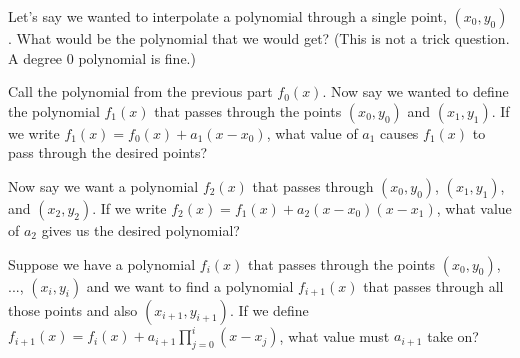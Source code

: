 \documentclass[11pt]{article}
\begin{document}
\begin{Parts}

	\Part Let's say we wanted to interpolate a polynomial through a single point, $(x_0, y_0)$.  What would be the polynomial that we would get?  (This is not a trick question. A degree 0 polynomial is fine.)
	
	\Part Call the polynomial from the previous part $f_0(x)$.  Now say we wanted to define the polynomial $f_1(x)$ that passes through the points $(x_0, y_0)$ and $(x_1, y_1)$.  If we write $f_1(x) = f_0(x) + a_1(x - x_0)$, what value of $a_1$ causes $f_1(x)$ to pass through the desired points?
	
	\Part Now say we want a polynomial $f_2(x)$ that passes through $(x_0, y_0)$, $(x_1, y_1)$, and $(x_2, y_2)$.  If we write $f_2(x) = f_1(x) + a_2(x - x_0)(x - x_1)$, what value of $a_2$ gives us the desired polynomial?
	
	\Part Suppose we have a polynomial $f_i(x)$ that passes through the points $(x_0, y_0)$, ..., $(x_i, y_i)$ and we want to find a polynomial $f_{i + 1}(x)$ that passes through all those points and also $(x_{i + 1}, y_{i + 1})$.  If we define $f_{i + 1}(x) = f_i(x) + a_{i + 1}\prod_{j = 0}^i (x - x_j)$, what value must $a_{i + 1}$ take on?
	
	
\end{Parts}
\end{document}
